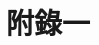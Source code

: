 
\newpage
{} %
\renewcommand{\bibname}{\protect\makebox[5cm][s]{\nameRef}}




\newpage
\renewcommand\prechaptername{}
\renewcommand\countermapping[1]{#1}
\renewcommand\postchaptername{}
\appendix
\chapter{附錄一}

%
%


